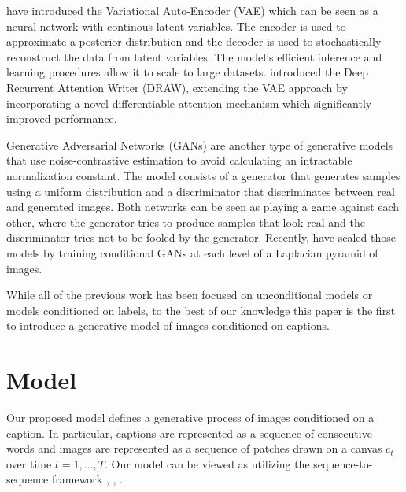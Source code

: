 \documentclass{article} %
\newcommand{\icaption}{{\bf{y}}}
\newcommand{\oimage}{{\bf{x}}}
\begin{document}
\cite{kingma_vae} have introduced the Variational Auto-Encoder (VAE) which can be seen as a neural network with continous latent variables. The encoder is used to approximate a posterior distribution and the decoder is used to stochastically reconstruct the data from latent variables. The model's efficient inference and learning procedures allow it to scale to large datasets. 
\cite{gregor_draw} introduced the Deep Recurrent Attention Writer (DRAW), extending the VAE approach by incorporating a novel differentiable attention mechanism which significantly improved performance.%

Generative Adversarial Networks (GANs) \citep{goodfellow_gan} are another type of generative models that use noise-contrastive estimation \citep{gutmann_nce} to avoid calculating an intractable normalization constant. The model consists of a generator that generates samples using a uniform distribution and a discriminator that discriminates between real and generated images. 
Both networks can be seen as playing a game against each other, where the generator tries to produce samples that look real and the discriminator tries not to be fooled by the generator. 
Recently, \cite{denton_lapgan} have scaled those models by training conditional GANs at each level of a Laplacian pyramid of images. 

While all of the previous work has been focused on unconditional models or models conditioned on labels, to the best of our knowledge this paper is the first to introduce a generative model of images conditioned on captions.

\section{Model}
Our proposed model 
defines a generative process of images conditioned on a caption. In particular, captions are represented as a sequence of consecutive words and images are represented as a sequence of patches drawn on a canvas $c_t$ over time $t=1,...,T$. Our model can be viewed as utilizing the sequence-to-sequence framework \citep{ilya_mt}, \citep{cho_mt}, \citep{nitish_video}.
\end{document}
